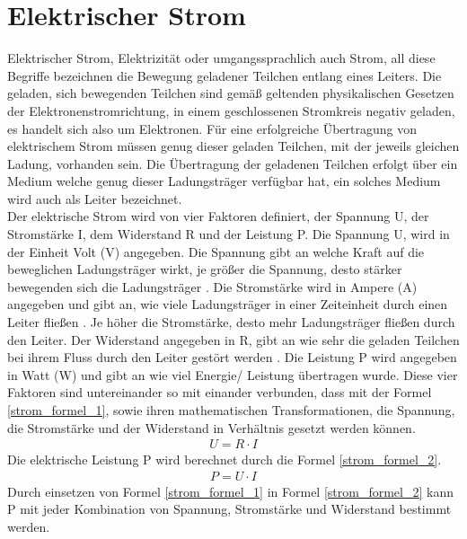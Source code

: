 \section{Elektrischer Strom}
Elektrischer Strom, Elektrizität oder umgangssprachlich auch Strom, all diese Begriffe bezeichnen die Bewegung geladener Teilchen entlang eines Leiters. Die geladen, sich bewegenden Teilchen sind gemäß geltenden physikalischen Gesetzen der Elektronenstromrichtung, in einem geschlossenen Stromkreis negativ geladen, es handelt sich also um Elektronen. Für eine erfolgreiche Übertragung von elektrischem Strom müssen genug dieser geladen Teilchen, mit der jeweils gleichen Ladung, vorhanden sein. Die Übertragung der geladenen Teilchen erfolgt über ein Medium welche genug dieser Ladungsträger verfügbar hat, ein solches Medium wird auch als Leiter bezeichnet.\\
Der elektrische Strom wird von vier Faktoren definiert, der Spannung U, der Stromstärke I, dem Widerstand R und der Leistung P. Die Spannung U, wird in der Einheit Volt (V) angegeben. Die Spannung gibt an welche Kraft auf die beweglichen Ladungsträger wirkt, je größer die Spannung, desto stärker bewegenden sich die Ladungsträger \cite{spannung_1}. Die Stromstärke wird in Ampere (A) angegeben und gibt an, wie viele Ladungsträger in einer Zeiteinheit durch einen Leiter fließen \cite{stromstaerke_1}. Je höher die Stromstärke, desto mehr Ladungsträger fließen durch den Leiter. Der Widerstand angegeben in R, gibt an wie sehr die geladen Teilchen bei ihrem Fluss durch den Leiter gestört werden \cite{widerstand_1}. Die Leistung P wird angegeben in Watt (W) und gibt an wie viel Energie/ Leistung übertragen wurde. Diese vier Faktoren sind untereinander so mit einander verbunden, dass mit der Formel \ref{strom_formel_1}, sowie ihren mathematischen Transformationen, die Spannung, die Stromstärke und der Widerstand in Verhältnis gesetzt werden können.
\begin{align}
	U  =  R \cdot I
	\label{strom_formel_1}
\end{align}
Die elektrische Leistung P wird berechnet durch die Formel \ref{strom_formel_2}.
\begin{align}
	P = U \cdot I
	\label{strom_formel_2}
\end{align}
Durch einsetzen von Formel \ref{strom_formel_1} in Formel \ref{strom_formel_2} kann P mit jeder Kombination von Spannung, Stromstärke und Widerstand bestimmt werden.\\
